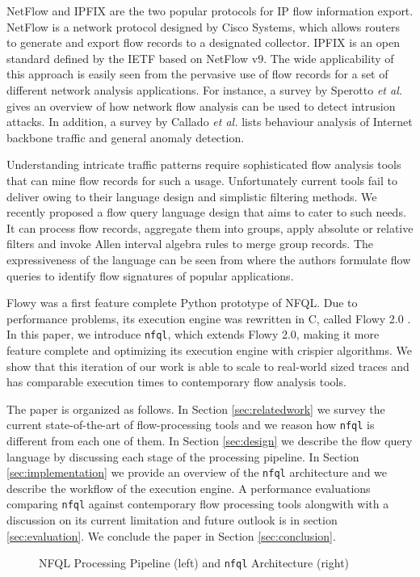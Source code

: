 NetFlow and \ac{IPFIX} are the two popular protocols for IP flow information
export. NetFlow \cite{rfc3954} is a network protocol designed by Cisco
Systems, which allows routers to generate and export flow records to a
designated collector. \ac{IPFIX} \cite{rfc5101} is an open standard defined by
the IETF based on NetFlow v$9$. The wide applicability of this approach is
easily seen from the pervasive use of flow records for a set of different
network analysis applications. For instance, a survey by Sperotto \textit{et
al.} \cite{sperotto:2010} gives an overview of how network flow analysis can
be used to detect intrusion attacks. In addition, a survey by Callado
\textit{et al.} \cite{callado:2009} lists behaviour analysis of Internet
backbone traffic and general anomaly detection.

Understanding intricate traffic patterns require sophisticated flow analysis
tools that can mine flow records for such a usage.  Unfortunately current
tools fail to deliver owing to their language design and simplistic filtering
methods.  We recently proposed a flow query language design
\cite{vmarinov:2009} that aims to cater to such needs.  It can process flow
records, aggregate them into groups, apply absolute or relative filters and
invoke Allen interval algebra rules \cite{fallen:1983} to merge group records.
The expressiveness of the language can be seen from \cite{vperelman:2011}
where the authors formulate flow queries to identify flow signatures of
popular applications.

Flowy \cite{kkanev:2010} was a first feature complete Python prototype of
\ac{NFQL}. Due to performance problems, its execution engine was rewritten in
C, called Flowy 2.0 \cite{jschauer:thesis:2011}. In this paper, we introduce
\texttt{nfql}, which extends Flowy 2.0, making it more feature complete and
optimizing its execution engine with crispier algorithms.  We show that this
iteration of our work is able to scale to real-world sized traces and has
comparable execution times to contemporary flow analysis tools.

The paper is organized as follows. In Section \ref{sec:relatedwork} we survey
the current state-of-the-art of flow-processing tools and we reason how
\texttt{nfql} is different from each one of them. In Section \ref{sec:design}
we describe the flow query language by discussing each stage of the processing
pipeline. In Section \ref{sec:implementation} we provide an overview of the
\texttt{nfql} architecture and we describe the workflow of the execution
engine. A performance evaluations comparing \texttt{nfql} against contemporary
flow processing tools alongwith with a discussion on its current limitation
and future outlook is in section \ref{sec:evaluation}. We conclude the paper
in Section \ref{sec:conclusion}.

\begin{figure*}[!t]
   \label{foo}
  \hfil {}
  \label{bar} \caption{NFQL Processing Pipeline \cite{vmarinov:2009} (left)
  and \texttt{nfql} Architecture (right)} \label{fig:nfql-pipeline}
\end{figure*}
